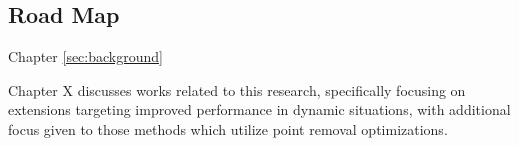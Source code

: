 \subsection{Road Map}

Chapter \ref{sec:background}

Chapter X discusses works related to this research, specifically focusing on extensions targeting improved performance in dynamic situations, with additional focus given to those methods which utilize point removal optimizations.